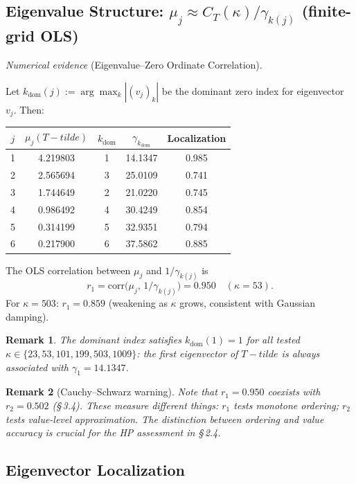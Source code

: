 \documentclass[11pt]{article}
\def\Tt{T-tilde}%
\newtheorem*{remark}{Remark}
\newcommand{\Tt}{\widetilde{T}}
\newcommand{\CT}{C_{T}}
\newcommand{\kdom}{k_{\mathrm{dom}}}
\begin{document}
\subsection{Eigenvalue Structure: $\mu_j \approx \CT(\kappa)/\gamma_{k(j)}$ (finite-grid OLS)}

\emph{Numerical evidence} (Eigenvalue--Zero Ordinate Correlation).

Let $\kdom(j) := \arg\max_k|(v_j)_k|$ be the dominant zero index
for eigenvector $v_j$. Then:

\begin{center}
\begin{tabular}{ccccc}
\toprule
$j$ & $\mu_j(\Tt)$ & $\kdom$ & $\gamma_{\kdom}$ & Localization \\
\midrule
1 & 4.219803 & 1 & 14.1347 & 0.985 \\
2 & 2.565694 & 3 & 25.0109 & 0.741 \\
3 & 1.744649 & 2 & 21.0220 & 0.745 \\
4 & 0.986492 & 4 & 30.4249 & 0.854 \\
5 & 0.314199 & 5 & 32.9351 & 0.794 \\
6 & 0.217900 & 6 & 37.5862 & 0.885 \\
\bottomrule
\end{tabular}
\end{center}

The OLS correlation between $\mu_j$ and $1/\gamma_{k(j)}$ is
\[
r_1 = \mathrm{corr}\bigl(\mu_j,\,1/\gamma_{k(j)}\bigr) = 0.950
\quad(\kappa=53).
\]
For $\kappa=503$: $r_1 = 0.859$ (weakening as $\kappa$ grows,
consistent with Gaussian damping).

\begin{remark}
The dominant index satisfies $\kdom(1) = 1$ for all tested
$\kappa\in\{23,53,101,199,503,1009\}$:
the first eigenvector of $\Tt$ is always associated with
$\gamma_1 = 14.1347$.
\end{remark}

\begin{remark}[Cauchy--Schwarz warning]
Note that $r_1 = 0.950$ coexists with $r_2 = 0.502$ (\S\,3.4).
These measure different things: $r_1$ tests monotone ordering;
$r_2$ tests value-level approximation.
The distinction between ordering and value accuracy is crucial for
the HP assessment in \S\,2.4.
\end{remark}

\subsection{Eigenvector Localization}
\end{document}
